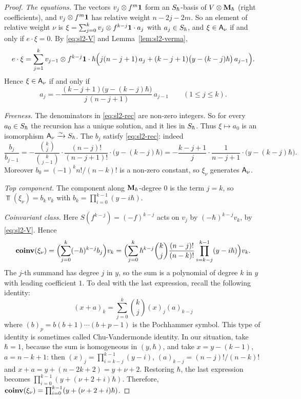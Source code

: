 \documentclass{article}
\theoremstyle{plain}
\theoremstyle{definition}
\theoremstyle{remark}
\numberwithin{equation}{section}
\begin{document}
\begin{proof}
\emph{The equations.} The vectors $v_j\otimes f^m\mathbf 1$ form an $S_\hbar$-basis of $V\otimes\mathbf{M}_\hbar$ (right coefficients), and $v_j\otimes f^m\mathbf 1$ has relative weight $n-2j-2m$. So an element of relative weight $\nu$ is $\xi=\sum_{j=0}^kv_j\otimes f^{k-j}\mathbf 1\cdot a_j$ with $a_j\in S_\hbar$, and $\xi\in\mathsf A_\nu$ if and only if $e\cdot\xi=0$. By \eqref{eq:sl2-V} and Lemma~\ref{lem:sl2-verma},
\[
e\cdot\xi=\sum_{j=1}^k v_{j-1}\otimes f^{k-j}\mathbf 1\cdot\hbar\Bigl(j(n-j+1)\,a_j+(k-j+1)\bigl(y-(k-j)\hbar\bigr)\,a_{j-1}\Bigr).
\]
Hence $\xi\in\mathsf A_\nu$ if and only if
\begin{equation}\label{eq:sl2-rec}
a_j=-\frac{(k-j+1)\bigl(y-(k-j)\hbar\bigr)}{j\,(n-j+1)}\,a_{j-1}\qquad(1\le j\le k).
\end{equation}

\emph{Freeness.} The denominators in \eqref{eq:sl2-rec} are non-zero integers. So for every $a_0\in S_\hbar$ the recursion has a unique solution, and it lies in $S_\hbar$. Thus $\xi\mapsto a_0$ is an isomorphism $\mathsf A_\nu\xrightarrow{\sim}S_\hbar$. The $b_j$ satisfy \eqref{eq:sl2-rec}: indeed
\[
\frac{b_j}{b_{j-1}}=-\frac{\binom kj}{\binom k{j-1}}\cdot\frac{(n-j)!}{(n-j+1)!}\cdot\bigl(y-(k-j)\hbar\bigr)=-\frac{k-j+1}{j}\cdot\frac1{n-j+1}\cdot\bigl(y-(k-j)\hbar\bigr).
\]
Moreover $b_0=(-1)^kn!/(n-k)!$ is a non-zero constant, so $\xi_\nu$ generates $\mathsf A_\nu$.

\emph{Top component.} The component along $\mathbf{M}_\hbar$-degree $0$ is the term $j=k$, so $\Top(\xi_\nu)=b_k\,v_k$ with $b_k=\prod_{i=0}^{k-1}(y-i\hbar)$.

\emph{Coinvariant class.} Here $S(f^{k-j})=(-f)^{k-j}$ acts on $v_j$ by $(-\hbar)^{k-j}v_k$, by \eqref{eq:sl2-V}. Hence
\[
\operatorname{\mathbf{coinv}}(\xi_\nu)=\Bigl(\sum_{j=0}^k(-\hbar)^{k-j}b_j\Bigr)v_k=\Bigl(\sum_{j=0}^k\hbar^{k-j}\binom kj\frac{(n-j)!}{(n-k)!}\prod_{i=k-j}^{k-1}(y-i\hbar)\Bigr)v_k .
\]
The $j$-th summand has degree $j$ in $y$, so the sum is a polynomial of degree $k$ in $y$ with leading coefficient $1$. To deal with the last expression, recall the following identity:
\begin{equation}\label{eq:Chu-Vander}
(x+a)_k = \sum_{j=0}^{k} \binom{k}{j}(x)_j (a)_{k-j}
\end{equation}
where $(b)_p = b(b+1)\cdots (b+p-1)$ is the Pochhammer symbol. This type of identity is sometimes called Chu-Vandermonde identity. In our situation, take $\hbar=1$, because the sum is homogeneous in $(y,\hbar)$, and take $x = y-(k-1)$, $a = n-k+1$: then $(x)_j=\prod_{i=k-j}^{k-1}(y-i)$, $(a)_{k-j}=(n-j)!/(n-k)!$ and $x+a = y+(n-2k+2) = y + \nu +2$. Restoring $\hbar$, the last expression becomes $\prod_{i=0}^{k-1}(y+(\nu + 2+i)\hbar)$. Therefore, $\operatorname{\mathbf{coinv}}(\xi_\nu) = \prod_{i=0}^{k-1}(y+(\nu+2+i)\hbar)$.
\end{proof}
\end{document}
